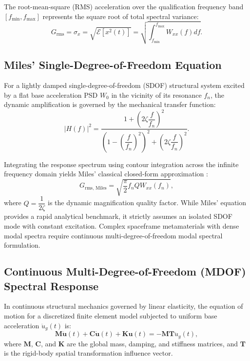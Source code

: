 The root-mean-square (RMS) acceleration over the qualification frequency band $[f_{\min}, f_{\max}]$ represents the square root of total spectral variance:
\begin{equation}
G_{\text{rms}} = \sigma_x = \sqrt{\mathcal{E}[x^2(t)]} = \sqrt{\int_{f_{\min}}^{f_{\max}} W_{xx}(f) df}.
\label{eq:grms_integral}
\end{equation}

\subsection{Miles' Single-Degree-of-Freedom Equation}

For a lightly damped single-degree-of-freedom (SDOF) structural system excited by a flat base acceleration PSD $W_0$ in the vicinity of its resonance $f_n$, the dynamic amplification is governed by the mechanical transfer function:
\begin{equation}
|H(f)|^2 = \frac{1 + \left(2\zeta \dfrac{f}{f_n}\right)^2}{\left(1 - \left(\dfrac{f}{f_n}\right)^2\right)^2 + \left(2\zeta \dfrac{f}{f_n}\right)^2}.
\label{eq:sdof_frf}
\end{equation}

Integrating the response spectrum using contour integration across the infinite frequency domain yields Miles' classical closed-form approximation \cite{miles1954}:
\begin{equation}
G_{\text{rms, Miles}} = \sqrt{\frac{\pi}{2} f_n Q W_{xx}(f_n)},
\label{eq:miles_equation}
\end{equation}
where $Q = \dfrac{1}{2\zeta}$ is the dynamic magnification quality factor. While Miles' equation provides a rapid analytical benchmark, it strictly assumes an isolated SDOF mode with constant excitation. Complex spaceframe metamaterials with dense modal spectra require continuous multi-degree-of-freedom modal spectral formulation.

\subsection{Continuous Multi-Degree-of-Freedom (MDOF) Spectral Response}

In continuous structural mechanics governed by linear elasticity, the equation of motion for a discretized finite element model subjected to uniform base acceleration $\ddot{u}_g(t)$ is:
\begin{equation}
\mathbf{M} \ddot{\mathbf{u}}(t) + \mathbf{C} \dot{\mathbf{u}}(t) + \mathbf{K} \mathbf{u}(t) = -\mathbf{M} \mathbf{T} \ddot{u}_g(t),
\label{eq:fe_equation_of_motion}
\end{equation}
where $\mathbf{M}$, $\mathbf{C}$, and $\mathbf{K}$ are the global mass, damping, and stiffness matrices, and $\mathbf{T}$ is the rigid-body spatial transformation influence vector.

